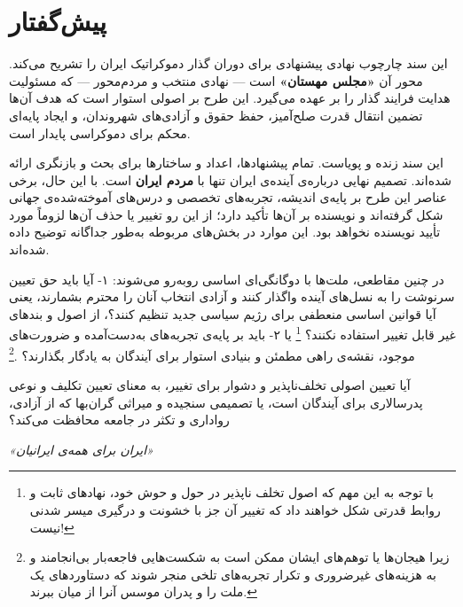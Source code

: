 \frontmatter
\pagestyle{plain}

\chapter*{پیش‌گفتار}
\begin{summarybox}

  این سند چارچوب نهادی پیشنهادی برای دوران گذار دموکراتیک ایران را تشریح می‌کند. محور آن \textbf{«مجلس مهستان»} است — نهادی منتخب و مردم‌محور — که مسئولیت هدایت فرایند گذار را بر عهده می‌گیرد. این طرح بر اصولی استوار است که هدف آن‌ها تضمین انتقال قدرت‌ صلح‌آمیز، حفظ حقوق و آزادی‌های شهروندان، و ایجاد پایه‌ای محکم برای دموکراسی پایدار است.

این سند زنده و پویاست. تمام پیشنهادها، اعداد و ساختارها برای بحث و بازنگری ارائه شده‌اند. تصمیم نهایی درباره‌ی آینده‌ی ایران تنها با \textbf{مردم ایران} است. با این حال، برخی عناصر این طرح بر پایه‌ی اندیشه، تجربه‌های تخصصی و درس‌های آموخته‌شده‌ی جهانی شکل گرفته‌اند و نویسنده بر آن‌ها تأکید دارد؛ از این رو تغییر یا حذف آن‌ها لزوماً مورد تأیید نویسنده نخواهد بود. این موارد در بخش‌های مربوطه به‌طور جداگانه توضیح داده شده‌اند.

در چنین مقاطعی، ملت‌ها با دوگانگی‌ای اساسی روبه‌رو می‌شوند: ۱- آیا باید حق تعیین سرنوشت را به نسل‌های آینده واگذار کنند و آزادی انتخاب آنان را محترم بشمارند، یعنی آیا قوانین اساسی منعطفی برای رژیم سیاسی جدید تنظیم کنند؟، از اصول و بندهای غیر قابل تغییر استفاده نکنند؟ \footnote{ با توجه به این مهم که اصول تخلف ناپذیر در حول و حوش خود، نهادهای ثابت و روابط قدرتی شکل خواهند داد که تغییر آن جز با خشونت و درگیری میسر شدنی نیست!}  یا ۲- باید بر پایه‌ی تجربه‌های به‌دست‌آمده و ضرورت‌های موجود، نقشه‌ی راهی مطمئن و بنیادی استوار برای آیندگان به یادگار بگذارند؟ .\footnote{زیرا هیجان‌ها یا توهم‌های ایشان ممکن است به شکست‌هایی فاجعه‌بار بی‌انجامند و به هزینه‌های غیرضروری و تکرار تجربه‌های تلخی منجر شوند که دستاوردهای یک ملت را و پدران موسس آنرا از میان ببرند.}

آیا تعیین اصولی تخلف‌ناپذیر و دشوار برای تغییر، به معنای تعیین تکلیف و نوعی پدرسالاری برای آیندگان است، یا تصمیمی سنجیده و میراثی گران‌بها که از آزادی، رواداری و تکثر در جامعه محافظت می‌کند؟

\end{summarybox}

\vspace{1cm}
\begin{center}
	{\large\color{MahestanDarkBlue}\itshape
		«ایران برای همه‌ی ایرانیان»}
\end{center}

